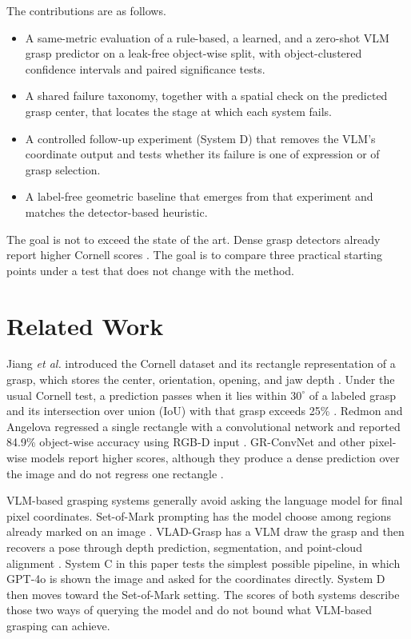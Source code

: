 \documentclass[10pt,conference,compsoc]{IEEEtran}
\begin{document}
The contributions are as follows.
\begin{itemize}
\item A same-metric evaluation of a rule-based, a learned, and a zero-shot
VLM grasp predictor on a leak-free object-wise split, with object-clustered
confidence intervals and paired significance tests.
\item A shared failure taxonomy, together with a spatial check on the
predicted grasp center, that locates the stage at which each system fails.
\item A controlled follow-up experiment (System D) that removes the VLM's
coordinate output and tests whether its failure is one of expression or of
grasp selection.
\item A label-free geometric baseline that emerges from that experiment and
matches the detector-based heuristic.
\end{itemize}

The goal is not to exceed the state of the art. Dense grasp detectors already
report higher Cornell scores \cite{kumra2020}. The goal is to compare three
practical starting points under a test that does not change with the method.

\section{Related Work}

Jiang \emph{et al.} introduced the Cornell dataset and its rectangle
representation of a grasp, which stores the center, orientation, opening, and
jaw depth \cite{jiang2011}. Under the usual Cornell test, a prediction passes
when it lies within $30^\circ$ of a labeled grasp and its intersection over
union (IoU) with that grasp exceeds 25\% \cite{lenz2015}. Redmon and Angelova
regressed a single rectangle with a convolutional network and reported 84.9\%
object-wise accuracy using RGB-D input \cite{redmon2015}. GR-ConvNet and other
pixel-wise models report higher scores, although they produce a dense
prediction over the image and do not regress one rectangle \cite{kumra2020}.

VLM-based grasping systems generally avoid asking the language model for
final pixel coordinates. Set-of-Mark prompting has the model choose among
regions already marked on an image \cite{yang2024}. VLAD-Grasp has a VLM draw
the grasp and then recovers a pose through depth prediction, segmentation,
and point-cloud alignment \cite{kulshrestha2025}. System C in this paper tests
the simplest possible pipeline, in which GPT-4o is shown the image and asked
for the coordinates directly. System D then moves toward the Set-of-Mark
setting. The scores of both systems describe those two ways of querying the
model and do not bound what VLM-based grasping can achieve.
\end{document}
